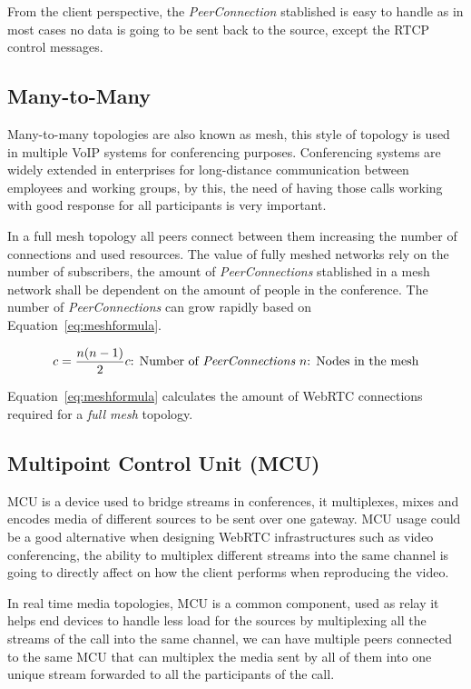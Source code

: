 From the client perspective, the {\it PeerConnection} stablished is easy to handle as  in most cases no data is going to be sent back to the source, except the RTCP control messages.

\subsection{Many-to-Many}

Many-to-many topologies are also known as mesh, this style of topology is used in multiple VoIP systems for conferencing purposes. Conferencing systems are widely extended in enterprises for long-distance communication between employees and working groups, by this, the need of having those calls working with good response for all participants is very important.

In a full mesh topology all peers connect between them increasing the number of connections and used resources. The value of fully meshed networks rely on the number of subscribers, the amount of {\it PeerConnections} stablished in a mesh network shall be dependent on the amount of people in the conference. The number of {\it PeerConnections} can grow rapidly based on Equation~\ref{eq:meshformula}.

\begin{equation}
	\label{eq:meshformula}
	c = \frac{n(n-1)}{2}\\
	
	c \text{: Number of {\it PeerConnections}}\
		
	n \text{: Nodes in the mesh}
\end{equation}

Equation~\ref{eq:meshformula} calculates the amount of WebRTC connections required for a {\it full mesh} topology. 

\subsection{Multipoint Control Unit (MCU)}

MCU  is a device used to bridge streams in conferences, it multiplexes, mixes and encodes media of different sources to be sent over one gateway. MCU usage could be a good alternative when designing WebRTC infrastructures such as video conferencing, the ability to multiplex different streams into the same channel is going to directly affect on how the client performs when reproducing the video.

In real time media topologies, MCU is a common component, used as relay it helps end devices to handle less load for the sources by multiplexing all the streams of the call into the same channel, we can have multiple peers connected to the same MCU that can multiplex the media sent by all of them into one unique stream forwarded to all the participants of the call.


